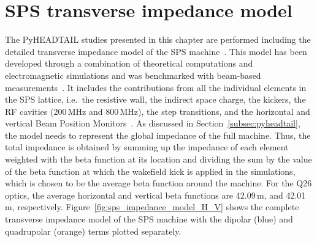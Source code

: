 \section{SPS transverse impedance model}\label{sec:sps_impedance_model}
The PyHEADTAIL studies presented in this chapter are performed including the detailed transverse impedance model of the SPS machine~\cite{sps_impedance_model_git}. This model has been developed through a combination of theoretical computations and electromagnetic simulations and was benchmarked with beam-based measurements~\cite{Salvant:1274254, Zannini:1561199, Salvant:1271349, Zannini:2141779}. 
It includes the contributions from all the individual elements in the SPS lattice, i.e.~the resistive wall, the indirect space charge, the kickers, the RF cavities (200\,MHz and 800\,MHz), the step transitions, and the horizontal and vertical Beam Position Monitors~\cite{Zannini:2141779}. As discussed in  Section~\ref{subsec:pyheadtail}, the model needs to represent the global impedance of the full machine. Thus, the total impedance is obtained by summing up the impedance of each element weighted with the beta function at its location and dividing the sum by the value of the beta function at which the wakefield kick is applied in the simulations, which is chosen to be the average beta function around the machine. For the Q26 optics, the average horizontal and vertical beta functions are 42.09\,m, and 42.01\,m, respectively.
Figure~\ref{fig:sps_impedance_model_H_V} shows the complete transverse impedance model of the SPS machine with the dipolar (blue) and quadrupolar (orange) terms plotted separately. 


